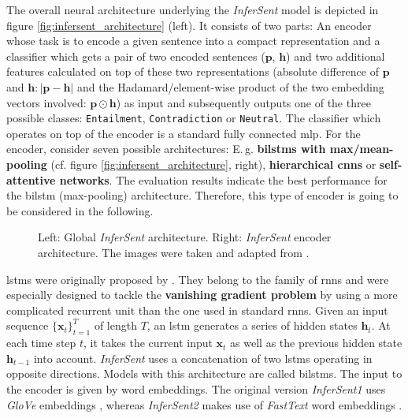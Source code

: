 The overall neural architecture underlying the \textit{InferSent} model is depicted in figure \vref{fig:infersent_architecture} (left). It consists of two parts:  An encoder whose task is to encode a given sentence into a compact representation and  a classifier which gets a pair of two encoded sentences ($\bm{p}$, $\bm{h}$) and two additional features calculated on top of these two representations (absolute difference of $\bm{p}$ and $\bm{h}: \vert \bm{p} - \bm{h}\vert$ and the Hadamard/element-wise product of the two embedding vectors involved: $\bm{p} \odot \bm{h}$) as input and subsequently outputs one of the three possible classes: \texttt{Entailment}, \texttt{Contradiction} or \texttt{Neutral}. The classifier which operates on top of the encoder is a standard fully connected \gls{mlp}. For the encoder, \citep{Conneau.2017} consider seven possible architectures: E.\,g. \textbf{\glspl{bilstm} with max/mean-pooling} (cf. figure \vref{fig:infersent_architecture}, right), \textbf{hierarchical \glspl{cnn}} or \textbf{self-attentive networks}. The evaluation results indicate the best performance for the \gls{bilstm} (max-pooling) architecture. Therefore, this type of encoder is going to be considered in the following.

\begin{figure}
\begin{minipage}{0.59\textwidth}

\end{minipage}
\hfill
\begin{minipage}{0.39\textwidth}

\end{minipage}
\caption[\textit{InferSent} architecture]{Left: Global \textit{InferSent} architecture. Right: \textit{InferSent} encoder architecture. The images were taken and adapted from \citep{Conneau.2017}.}
\label{fig:infersent_architecture}
\end{figure}

\glspl{lstm} were originally proposed by \citep{Hochreiter.1997}. They belong to the family of \glspl{rnn} and were especially designed to tackle the \textbf{vanishing gradient problem} \citep{Hochreiter.1998} by using a more complicated recurrent unit than the one used in standard \glspl{rnn}. Given an input sequence $\{ \bm{x}_t \}_{t=1}^T$ of length $T$, an \gls{lstm} generates a series of hidden states $\bm{h}_t$. At each time step $t$, it takes the current input $\bm{x}_t$ as well as the previous hidden state $\bm{h}_{t-1}$ into account. \textit{InferSent} uses a concatenation of two \glspl{lstm} operating in opposite directions. Models with this architecture are called \glspl{bilstm}. The input to the encoder is given by word embeddings. The original version \textit{InferSent1} uses \textit{GloVe} embeddings \citep{Pennington.2014}, whereas \textit{InferSent2} makes use of \textit{FastText} word embeddings \citep{Bojanowski.2017}.

